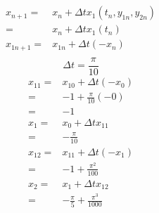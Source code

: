 \documentclass{article}
\begin{document}
        \subsection{}
            \begin{equation*}
                \begin{split}
                    x_{n+1}=&x_{n}+\Delta t x_1(t_n,y_{1n},y_{2n})\\
                        =&x_{n}+\Delta t x_1(t_n)\\
                    x_{1n+1}=&x_{1n}+\Delta t (-x_n)\\
                \end{split}
            \end{equation*}
            $$\Delta t=\frac{\pi}{10}$$
            \begin{equation*}
                \begin{split}
                    x_{11}=&x_{10}+\Delta t (-x_0)\\
                        =&-1+\frac{\pi}{10}(-0)\\
                        =&-1\\
                    x_1=&x_0+\Delta t x_{11}\\
                        =&-\frac{\pi}{10}\\
                    x_{12}=&x_{11}+\Delta t (-x_1)\\
                        =&-1+\frac{\pi^2}{100}\\
                    x_2=&x_1+\Delta t x_{12}\\
                        =&-\frac{\pi}{5}+\frac{\pi^3}{1000}\\
                \end{split}
            \end{equation*}
\end{document}
